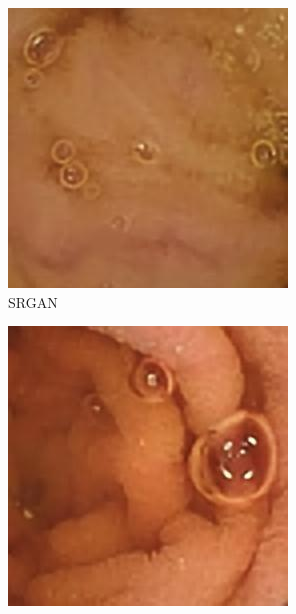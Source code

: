 \begin{figure}[H]
  \begin{subfigure}[b]{0.275\textwidth}
    \includegraphics[width=\textwidth]{Chapter7/srgan_9.jpg}
    \caption{SRGAN}
  \end{subfigure}
  \begin{subfigure}[b]{0.275\textwidth}
    \includegraphics[width=\textwidth]{Chapter7/srgan_445.jpg}

\end{subfigure}
\end{figure}
